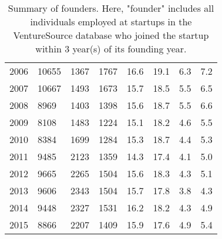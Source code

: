 \begin{table}[!htb]
\begin{tabular}{p{1.75cm}p{1.75cm}p{1.75cm}p{1.75cm}p{1.75cm}p{1.75cm}p{1.75cm}p{1.75cm}}
  2006 & 10655 & 1367 & 1767 & 16.6 & 19.1 & 6.3 & 7.2 \\ 
  2007 & 10667 & 1493 & 1673 & 15.7 & 18.5 & 5.5 & 6.5 \\ 
  2008 & 8969 & 1403 & 1398 & 15.6 & 18.7 & 5.5 & 6.6 \\ 
  2009 & 8108 & 1483 & 1224 & 15.1 & 18.2 & 4.6 & 5.5 \\ 
  2010 & 8384 & 1699 & 1284 & 15.3 & 18.7 & 4.4 & 5.3 \\ 
  2011 & 9485 & 2123 & 1359 & 14.3 & 17.4 & 4.1 & 5.0 \\ 
  2012 & 9665 & 2265 & 1504 & 15.6 & 18.3 & 4.3 & 5.1 \\ 
  2013 & 9606 & 2343 & 1504 & 15.7 & 17.8 & 3.8 & 4.3 \\ 
  2014 & 9448 & 2327 & 1531 & 16.2 & 18.2 & 4.3 & 4.9 \\ 
  2015 & 8866 & 2207 & 1409 & 15.9 & 17.6 & 4.9 & 5.4 \\ 
   \bottomrule
\end{tabular}
\endgroup
\caption{Summary of founders. Here, "founder" includes all individuals employed at startups in the VentureSource database who joined the startup within 3 year(s) of its founding year.} 
\label{table:GStable_all}
\end{table}
